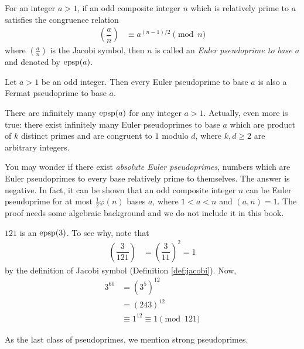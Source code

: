 \documentclass{subfile}
\begin{document}
	\begin{definition}\label{def:eulerpseudoprime}
		For an integer $a>1$, if an odd composite integer $n$ which is relatively prime to $a$ satisfies the congruence relation
			\begin{align*}
				\left(\dfrac{a}{n}\right)
					& \equiv a^{(n-1)/2} \pmod n
			\end{align*}
		where $\left(\frac{a}{n}\right)$ is the Jacobi symbol, then $n$ is called an \textit{Euler pseudoprime to base $a$} and denoted by $\operatorname{epsp}(a)$.
	\end{definition}

	\begin{corollary}
		Let $a>1$ be an odd integer. Then every Euler pseudoprime to base $a$ is also a Fermat pseudoprime to base $a$.
	\end{corollary}

There are infinitely many $\operatorname{epsp}(a)$ for any integer $a>1$. Actually, even more is true: there exist infinitely many Euler pseudoprimes to base $a$ which are product of $k$ distinct primes and are congruent to $1$ modulo $d$, where $k, d \geq 2$ are arbitrary integers.

You may wonder if there exist \textit{absolute Euler pseudoprimes}, numbers which are Euler pseudoprimes to every base relatively prime to themselves. The answer is negative. In fact, it can be shown that an odd composite integer $n$ can be Euler pseudoprime for at most $\frac{1}{2}\varphi(n)$ bases $a$, where $1<a<n$ and $(a,n)=1$. The proof needs some algebraic background and we do not include it in this book.

	\begin{example}
		$121$ is an $\operatorname{epsp}(3)$. To see why, note that
			\begin{align*}
				\left(\dfrac{3}{121}\right)
					& = \left(\dfrac{3}{11}\right)^2 = 1
			\end{align*}
		by the definition of Jacobi symbol (Definition \ref{def:jacobi}). Now,
			\begin{align*}
				3^{60}
					& = \left(3^5\right)^{12}\\
					& =\left(243\right)^{12}\\
					& \equiv 1^{12} \equiv 1 \pmod{121}
			\end{align*}
	\end{example}

As the last class of pseudoprimes, we mention strong pseudoprimes.
\end{document}
